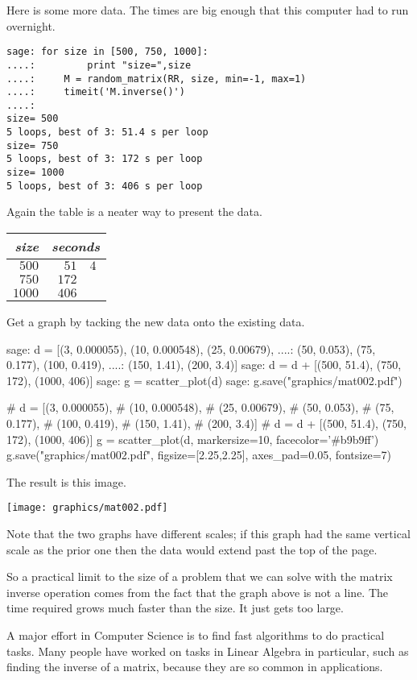 Here is some more data.
The times are big enough that this computer had to run overnight.
\begin{lstlisting}
sage: for size in [500, 750, 1000]:                             
....:         print "size=",size
....:     M = random_matrix(RR, size, min=-1, max=1)
....:     timeit('M.inverse()')
....: 
size= 500
5 loops, best of 3: 51.4 s per loop
size= 750
5 loops, best of 3: 172 s per loop
size= 1000
5 loops, best of 3: 406 s per loop
\end{lstlisting}
Again the table is a neater way to present the data.
\begin{center}
  \begin{tabular}{r|r@{.}l}
    \textit{size}     &\multicolumn{2}{c}{\textit{seconds}}  \\  \hline
    $500$       &$51$ &$4$ \\
    $750$       &$172$ &   \\
    $1000$      &$406$ &   
  \end{tabular}
\end{center}
Get a graph by tacking the new data onto the existing data.
\begin{sagecommandline}
sage: d = [(3, 0.000055), (10, 0.000548), (25, 0.00679),  
....:      (50, 0.053), (75, 0.177), (100, 0.419), 
....:      (150, 1.41), (200, 3.4)]
sage: d = d + [(500, 51.4), (750, 172), (1000, 406)]
sage: g = scatter_plot(d)                           
sage: g.save("graphics/mat002.pdf")                      
\end{sagecommandline}
\begin{sagesilent}
# d = [(3, 0.000055),    
#      (10, 0.000548), 
#      (25, 0.00679),  
#      (50, 0.053), 
#      (75, 0.177), 
#      (100, 0.419), 
#      (150, 1.41), 
#      (200, 3.4)]
# d = d + [(500, 51.4), (750, 172), (1000, 406)]
g = scatter_plot(d, markersize=10, facecolor='#b9b9ff')
g.save("graphics/mat002.pdf", figsize=[2.25,2.25], axes_pad=0.05, fontsize=7)              
\end{sagesilent}
The result is this image.
\begin{center}
  \texttt{[image: graphics/mat002.pdf]}
\end{center}
Note that the two graphs have different scales;
if this graph had the same vertical scale as the prior one
then the data would extend past the top of the page.

So a practical limit to the size of a problem that we can solve with
the matrix inverse operation comes from the fact that the graph above is
not a line.
The time required grows much faster than the size.
It just gets too large. 

A major effort in Computer Science is to find fast algorithms to 
do practical tasks.
Many people have worked on tasks in Linear Algebra in particular,
such as finding the inverse of a matrix, because
they are so common in applications.

\endinput


TODO:
